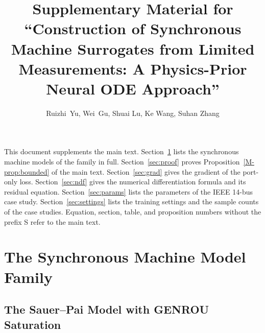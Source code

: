 \documentclass[10pt,journal]{IEEEtran}
\begin{document}
\title{Supplementary Material for ``Construction of Synchronous Machine Surrogates from Limited Measurements: A Physics-Prior Neural ODE Approach''}

\author{Ruizhi~Yu, Wei~Gu, Shuai Lu, Ke Wang, Suhan Zhang}

\maketitle

This document supplements the main text.
Section~\ref{sec:family} lists the synchronous machine models of the family in full.
Section~\ref{sec:proof} proves Proposition~\ref{M-prop:bounded} of the main text.
Section~\ref{sec:grad} gives the gradient of the port-only loss.
Section~\ref{sec:ndf} gives the numerical differentiation formula and its residual equation.
Section~\ref{sec:params} lists the parameters of the IEEE 14-bus case study.
Section~\ref{sec:settings} lists the training settings and the sample counts of the case studies.
Equation, section, table, and proposition numbers without the prefix S refer to the main text.

\section{The Synchronous Machine Model Family}\label{sec:family}

\subsection{The Sauer--Pai Model with GENROU Saturation}\label{ssec:sp}
\end{document}
